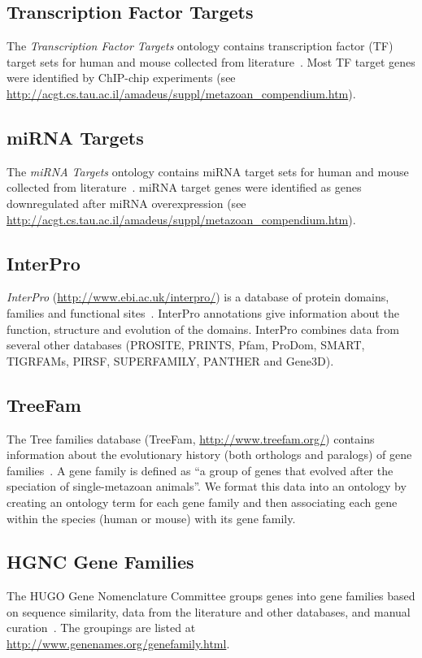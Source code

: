 \subsection{Transcription Factor Targets}
The \emph{Transcription Factor Targets} ontology contains transcription factor (TF) target sets for human and mouse collected from literature~\citep{Linhart2008}. 
Most TF target genes were identified by ChIP-chip experiments (see \url{http://acgt.cs.tau.ac.il/amadeus/suppl/metazoan_compendium.htm}).

\subsection{miRNA Targets}
The \emph{miRNA Targets} ontology contains miRNA target sets for human and mouse collected from literature~\citep{Linhart2008}. 
miRNA target genes were identified as genes downregulated after miRNA overexpression (see \url{http://acgt.cs.tau.ac.il/amadeus/suppl/metazoan_compendium.htm}).

\subsection{InterPro}
\emph{InterPro} (\url{http://www.ebi.ac.uk/interpro/}) is a database of protein domains, families and functional
sites~\citep{Hunter2009}. 
InterPro annotations give information about the function, structure and evolution of the domains. 
InterPro combines data from several other databases (PROSITE, PRINTS, Pfam, ProDom, SMART, TIGRFAMs, PIRSF, SUPERFAMILY,
PANTHER and Gene3D).

\subsection{TreeFam}
The Tree families database (TreeFam, \url{http://www.treefam.org/}) contains information about the evolutionary history
(both orthologs and paralogs) of gene families~\citep{Ruan2008}. 
A gene family is defined as ``a group of genes that evolved after the speciation of single-metazoan animals''.
We format this data into an ontology by creating an ontology term for each gene family and then associating
each gene within the species (human or mouse) with its gene family.

\subsection{HGNC Gene Families}
The HUGO Gene Nomenclature Committee groups genes into gene families based on sequence similarity, data from the literature
and other databases, and manual curation~\citep{Bruford2008}.  The groupings are listed at
\url{http://www.genenames.org/genefamily.html}.

